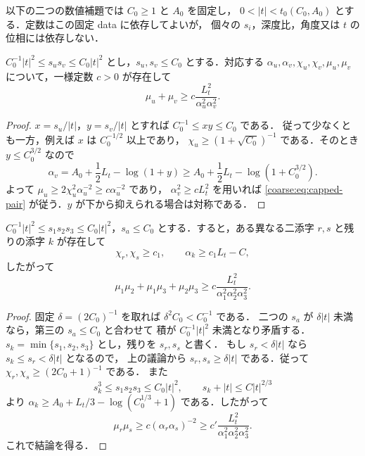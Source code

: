 \documentclass[a4paper,11pt]{ltjsarticle}
\numberwithin{equation}{section}
\theoremstyle{plain}
\theoremstyle{definition}
\theoremstyle{remark}
\begin{document}
以下の二つの数値補題では $C_0\ge1$ と $A_0$ を固定し，
$0<|t|<t_0(C_0,A_0)$ とする．定数はこの固定 data に依存してよいが，
個々の $s_i$，深度比，角度又は $t$ の位相には依存しない．

\begin{lemma}\label{coarse:lem:capped-pair}
$C_0^{-1}|t|^2\le s_us_v\le C_0|t|^2$ とし，$s_u,s_v\le C_0$ とする．対応する
$\alpha_u,\alpha_v,\chi_u,\chi_v,\mu_u,\mu_v$ について，一様定数 $c>0$ が存在して
\begin{equation}\label{coarse:eq:capped-pair}
 \mu_u+\mu_v
 \ge c\frac{L_t^2}{\alpha_u^2\alpha_v^2}.
\end{equation}
\end{lemma}

\begin{proof}
$x=s_u/|t|$，$y=s_v/|t|$ とすれば $C_0^{-1}\le xy\le C_0$ である．
従って少なくとも一方，例えば $x$ は $C_0^{-1/2}$ 以上であり，
$\chi_u\ge(1+\sqrt{C_0})^{-1}$ である．そのとき $y\le C_0^{3/2}$ なので
\[
 \alpha_v=A_0+\frac12L_t-\log(1+y)
 \ge A_0+\frac12L_t-\log(1+C_0^{3/2}).
\]
よって $\mu_u\ge2\chi_u^2\alpha_u^{-2}\ge c\alpha_u^{-2}$ であり，
$\alpha_v^2\ge cL_t^2$ を用いれば \eqref{coarse:eq:capped-pair} が従う．$y$ が下から抑えられる場合は対称である．
\end{proof}

\begin{lemma}\label{coarse:lem:capped-triple}
$C_0^{-1}|t|^2\le s_1s_2s_3\le C_0|t|^2$，$s_a\le C_0$ とする．すると，ある異なる二添字 $r,s$ と残りの添字 $k$ が存在して
\[
 \chi_r,\chi_s\ge c_1,
 \qquad
 \alpha_k\ge c_1L_t-C,
\]
したがって
\begin{equation}\label{coarse:eq:capped-triple}
 \mu_1\mu_2+\mu_1\mu_3+\mu_2\mu_3
 \ge c\frac{L_t^2}{\alpha_1^2\alpha_2^2\alpha_3^2}.
\end{equation}
\end{lemma}

\begin{proof}
固定 $\delta=(2C_0)^{-1}$ を取れば $\delta^2 C_0<C_0^{-1}$ である．
二つの $s_a$ が $\delta|t|$ 未満なら，第三の $s_a\le C_0$ と合わせて
積が $C_0^{-1}|t|^2$ 未満となり矛盾する．
$s_k=\min\{s_1,s_2,s_3\}$ とし，残りを $s_r,s_s$ と書く．
もし $s_r<\delta|t|$ なら $s_k\le s_r<\delta|t|$ となるので，
上の議論から $s_r,s_s\ge\delta|t|$ である．従って
$\chi_r,\chi_s\ge(2C_0+1)^{-1}$ である．
また
\[
 s_k^3\le s_1s_2s_3\le C_0|t|^2,
 \qquad
 s_k+|t|\le C|t|^{2/3}
\]
より $\alpha_k\ge A_0+L_t/3-\log(C_0^{1/3}+1)$ である．したがって
\[
 \mu_r\mu_s
 \ge c(\alpha_r\alpha_s)^{-2}
 \ge c'\frac{L_t^2}{\alpha_1^2\alpha_2^2\alpha_3^2}.
\]
これで結論を得る．
\end{proof}
\end{document}
